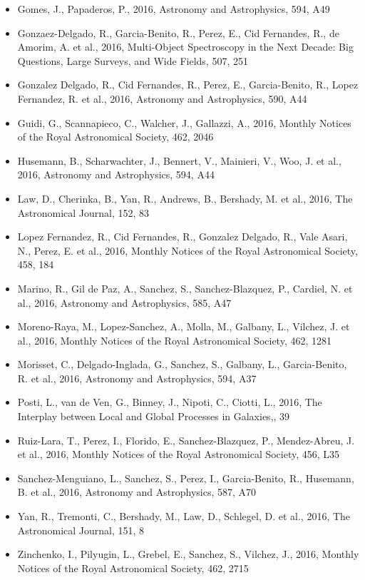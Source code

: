 \documentclass{letter}
\begin{document}
\begin{enumerate}
\begin{itemize}
\item Gomes, J., Papaderos, P., 2016, Astronomy and Astrophysics, 594, A49
\item Gonzaez-Delgado, R., Garcia-Benito, R., Perez, E., Cid Fernandes, R., de Amorim, A. et al., 2016, Multi-Object Spectroscopy in the Next Decade: Big Questions, Large Surveys, and Wide Fields, 507, 251
\item Gonzalez Delgado, R., Cid Fernandes, R., Perez, E., Garcia-Benito, R., Lopez Fernandez, R. et al., 2016, Astronomy and Astrophysics, 590, A44
\item Guidi, G., Scannapieco, C., Walcher, J., Gallazzi, A., 2016, Monthly Notices of the Royal Astronomical Society, 462, 2046
\item Husemann, B., Scharwachter, J., Bennert, V., Mainieri, V., Woo, J. et al., 2016, Astronomy and Astrophysics, 594, A44
\item Law, D., Cherinka, B., Yan, R., Andrews, B., Bershady, M. et al., 2016, The Astronomical Journal, 152, 83
\item Lopez Fernandez, R., Cid Fernandes, R., Gonzalez Delgado, R., Vale Asari, N., Perez, E. et al., 2016, Monthly Notices of the Royal Astronomical Society, 458, 184
\item Marino, R., Gil de Paz, A., Sanchez, S., Sanchez-Blazquez, P., Cardiel, N. et al., 2016, Astronomy and Astrophysics, 585, A47
\item Moreno-Raya, M., Lopez-Sanchez, A., Molla, M., Galbany, L., Vilchez, J. et al., 2016, Monthly Notices of the Royal Astronomical Society, 462, 1281
\item Morisset, C., Delgado-Inglada, G., Sanchez, S., Galbany, L., Garcia-Benito, R. et al., 2016, Astronomy and Astrophysics, 594, A37
\item Posti, L., van de Ven, G., Binney, J., Nipoti, C., Ciotti, L., 2016, The Interplay between Local and Global Processes in Galaxies,, 39
\item Ruiz-Lara, T., Perez, I., Florido, E., Sanchez-Blazquez, P., Mendez-Abreu, J. et al., 2016, Monthly Notices of the Royal Astronomical Society, 456, L35
\item Sanchez-Menguiano, L., Sanchez, S., Perez, I., Garcia-Benito, R., Husemann, B. et al., 2016, Astronomy and Astrophysics, 587, A70
\item Yan, R., Tremonti, C., Bershady, M., Law, D., Schlegel, D. et al., 2016, The Astronomical Journal, 151, 8
\item Zinchenko, I., Pilyugin, L., Grebel, E., Sanchez, S., Vilchez, J., 2016, Monthly Notices of the Royal Astronomical Society, 462, 2715

\end{itemize}
\end{enumerate}
\end{document}
